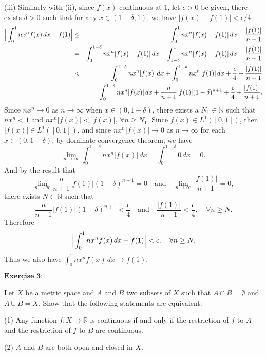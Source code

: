 \documentclass[12pt,a4paper]{ctexart}
\begin{document}
\vspace{6pt}

(iii) Similarly with (ii), since $f(x)$ continuous at $1$, let $\epsilon > 0$ be given, there exists $\delta > 0$ such that for any $x \in (1 - \delta, 1)$, we have $|f(x) - f(1)| < \epsilon/4$.
\begin{eqnarray*}
    \Big{|} \int_0^1 n x^n f(x) \, d x - f(1)  \Big{|} & \leq &  \int_0^1 n x^n |f(x) - f(1)| \, d x + \frac{|f(1)|}{n+1} \\
    & = & \int_{0}^{1- \delta} n x^n |f(x) - f(1)| \, d x + \int_{1 - \delta}^{1} n x^n |f(x) - f(1)| \, d x +  \frac{|f(1)|}{n+1} \\
    & < &  \int_{0}^{1- \delta} n x^n |f(x)| \, d x + \int_{0}^{1- \delta} n x^n |f(1)| \, d x + \frac{\epsilon}{4}  +  \frac{|f(1)|}{n+1} \\  
    & = & \int_{0}^{1- \delta} n x^n |f(x)| \, d x + \frac{n}{n+1} |f(1)| (1-\delta)^{n+1} + \frac{\epsilon}{4}  +  \frac{|f(1)|}{n+1}.
\end{eqnarray*}
Since $n x^n \to 0$ as $n \to \infty$ when $x \in (0, 1-\delta)$, there exists a $N_1 \in \mathbb N$ such that $n x^n < 1$ and $n x^n |f(x)| < |f(x)|$, $\forall n \geq N_1$. Since $f(x) \in L^1([0,1])$, then $|f(x)| \in L^1([0,1])$, and since $n x^n|f(x)| \to 0$ as $n \to \infty $ for each $x \in (0, 1- \delta)$, by dominate convergence theorem, we have
$$\lim_{n \to \infty} \int_{0}^{1- \delta} n x^n |f(x)| \, d x  = \int_{0}^{1- \delta} 0 \,d x = 0.$$
And by the result that 
$$\lim_{n \to \infty} \frac{n}{n+1} |f(1)| (1 - \delta)^{n+1} = 0 \quad \text{and} \quad \lim_{n \to \infty} \frac{|f(1)|}{n+1} = 0, $$
there exists $N \in \mathbb N$ such that
$$\frac{n}{n+1} |f(1)| (1 - \delta)^{n+1} < \frac{\epsilon}{4} \quad \text{and} \quad \frac{|f(1)|}{n+1} < \frac{\epsilon}{4}, \quad \forall n \geq N.$$
Therefore
$$\Big{|} \int_0^1 n x^n f(x) \, d x - f(1)  \Big{|}  < \epsilon, \quad \forall n \geq N.$$ 
Thus we also have $ \int_0^1 n x^n f(x) \, d x \to f(1)$.


\newpage 

$\underline{\textbf{Exercise 3:}}$

Let $X$ be a metric space and $A$ and $B$ two subsets of $X$ such that $A \cap B = \emptyset$ and $A \cup B = X$. Show that the following statements are equivalent:

(1) Any function $f: X \to \mathbb R$ is continuous if and only if the restriction of $f$ to $A$ and the restriction of $f$ to $B$ are continuous.

(2) $A$ and $B$ are both open and closed in $X$.
\end{document}
